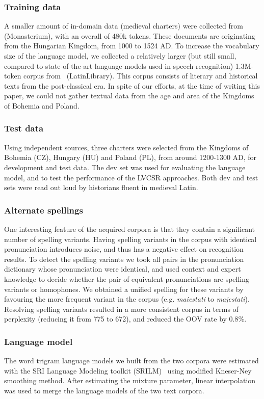 \documentclass[runningheads,a4paper]{llncs}
\begin{document}
\subsubsection{Training data}\label{traintext}
A smaller amount of in-domain data (medieval charters) were collected from~\cite{monasterium} (Monasterium), with an overall of 480k tokens.
These documents are originating from the Hungarian Kingdom, from 1000 to 1524 AD.
To increase the vocabulary size of the language model, we collected a relatively larger (but still small, compared to state-of-the-art language models used in speech recognition) 1.3M-token corpus from~\cite{latinlibrary} (LatinLibrary).
This corpus consists of literary and historical texts from the post-classical era.
In spite of our efforts, at the time of writing this paper, we could not gather textual data from the age and area of the Kingdoms of Bohemia and Poland.
\subsubsection{Test data}\label{testtext}
Using independent sources, three charters were selected from the Kingdoms of Bohemia (CZ), Hungary (HU) and Poland (PL), from around 1200-1300 AD, for development and test data.
The dev set was used for evaluating the language model, and to test the performance of the LVCSR approaches.
Both dev and test sets were read out loud by historians fluent in medieval Latin.
\subsubsection{Alternate spellings}
One interesting feature of the acquired corpora is that they contain a significant number of spelling variants.
Having spelling variants in the corpus with identical pronunciation introduces noise, and thus has a negative effect on recognition results.
To detect the spelling variants we took all pairs in the pronunciation dictionary whose pronunciation were identical, and used context and expert knowledge to decide whether the pair of equivalent pronunciations are spelling variants or homophones.
We obtained a unified spelling for these variants by favouring the more frequent variant in the corpus (e.g. \textit{maiestati} to \textit{majestati}).
Resolving spelling variants resulted in a more consistent corpus in terms of perplexity (reducing it from 775 to 672), and reduced the OOV rate by 0.8\%.
\subsubsection{Language model}
The word trigram language models we built from the two corpora were estimated with the SRI Language Modeling toolkit (SRILM)~\cite{srilm} using modified Kneser-Ney smoothing method.
After estimating the mixture parameter, linear interpolation was used to merge the language models of the two text corpora.
\end{document}
